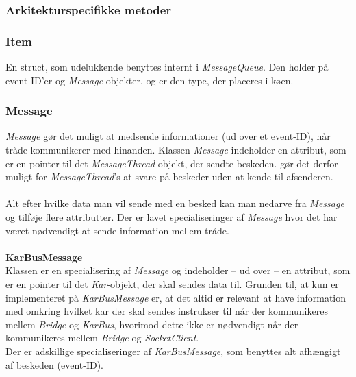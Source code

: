 \subsubsection{Arkitekturspecifikke metoder}

{
}

{
}

\subsubsection{Item}

En struct, som udelukkende benyttes internt i \textit{MessageQueue}. Den holder på event ID'er og \textit{Message}-objekter, og er den type, der placeres i køen.


\subsubsection{Message}

\textit{Message} gør det muligt at medsende informationer (ud over et event-ID), når tråde kommunikerer med hinanden. Klassen \textit{Message} indeholder en  attribut, som er en pointer til det \textit{MessageThread}-objekt, der sendte beskeden.  gør det derfor muligt for \textit{MessageThread}'s at svare på beskeder uden at kende til afsenderen.\\\\

Alt efter hvilke data man vil sende med en besked kan man nedarve fra \textit{Message} og tilføje flere attributter.  Der er lavet specialiseringer af \textit{Message} hvor det har været nødvendigt at sende information mellem tråde.\\\\

\textbf{KarBusMessage}\\
Klassen er en specialisering af \textit{Message} og indeholder – ud over  – en  attribut, som er en pointer til det \textit{Kar}-objekt, der skal sendes data til. Grunden til, at  kun er implementeret på \textit{KarBusMessage} er, at det altid er relevant at have information med omkring hvilket kar der skal sendes instrukser til når der kommunikeres mellem \textit{Bridge} og \textit{KarBus}, hvorimod dette ikke er nødvendigt når der kommunikeres mellem \textit{Bridge} og \textit{SocketClient}.\\
Der er adskillige specialiseringer af \textit{KarBusMessage}, som benyttes alt afhængigt af beskeden (event-ID).\\\\

